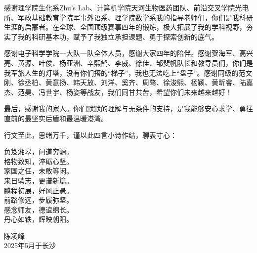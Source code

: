 \begin{ack}
感谢理学院生化系Zhu's Lab、计算机学院天河生物医药团队、前沿交叉学院光电所、军政基础教育学院军事外语系、理学院数学系我的指导老师们，你们是我科研生涯的启蒙者。在全球、全国顶级赛事四年的锻炼，极大拓展了我的学科视野，夯实了我的科研基本功，赋予了我独立承担课题、勇于探索创新的底气。

感谢电子科学学院一大队一队全体人员，感谢大家四年的陪伴。感谢贺海军、高兴亮、黄源、叶俊、杨亚洲、辛熙鹤、李威、徐佳、邹斐帆队长和教导员们，你们是我军旅人生的灯塔，没有你们搭的“梯子”，我也无法吃上“盘子”。感谢同级的范文刚、徐丞柏、黄意扬、韩天放、刘洋、奚齐、周骜、徐浚熙、杨颖、黄昕睿、陆嘉杰、范昊、冯世宇、杨姿等战友，我们同甘共苦，希望你们未来越来越好！

最后，感谢我的家人。你们默默的理解与无条件的支持，是我能够安心求学、勇往直前的最坚实后盾和最温暖港湾。

行文至此，思绪万千，谨以此四言小诗作结，聊表寸心：

\begin{center}
负笈湘皋，问道穷源。\\
格物致知，淬砺心坚。\\
家国之任，未敢等闲。\\
来日骋志，更谱新篇。\\
鹏程初展，好风正悬。\\
前路修远，步履弥坚。\\
感念师友，德谊绵长。\\
丹心如铁，辉映朝阳。
\end{center}

\vspace{2\baselineskip} %
\begin{flushright}
{\kaishu 陈凌峰~~~~~~~~~~~} \\ %
2025年5月于长沙 %
\end{flushright}
  
\end{ack}
